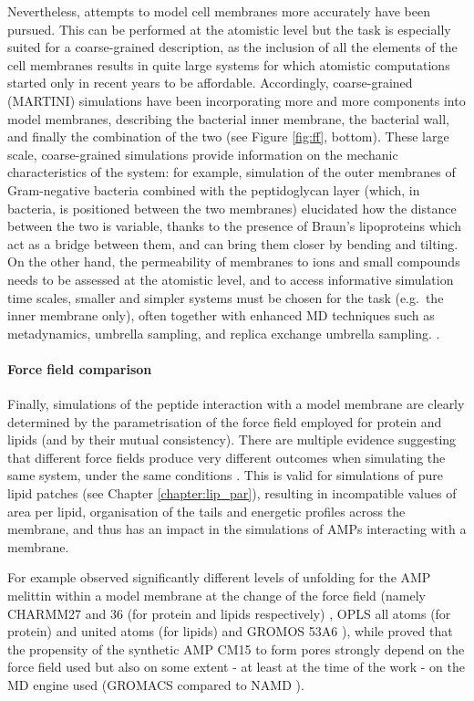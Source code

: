 Nevertheless, attempts to model cell membranes more accurately have been pursued. This can be performed at the atomistic level \citep{Piggot2011}
but the task is especially suited for a coarse-grained description, as the inclusion of all the elements of the cell membranes results in quite large systems for which atomistic computations started only in recent years to be affordable.
%
Accordingly, coarse-grained (MARTINI) simulations have been incorporating more and more components into model membranes, describing the bacterial inner membrane, the bacterial wall, and finally the combination of the two \citep{Khalid2019} (see Figure \ref{fig:ff}, bottom).
%
These large scale, coarse-grained simulations provide information on the mechanic characteristics of the system: for example, simulation of the outer membranes of Gram-negative bacteria combined with the peptidoglycan layer (which, in bacteria, is positioned between the two membranes) elucidated how the distance between the two is variable, thanks to the presence of Braun's lipoproteins \citep{Asmar2018} which act as a bridge between them, and can bring them closer by bending and tilting.
%
On the other hand, the permeability of membranes to ions and small compounds needs to be assessed at the atomistic level, and to access informative simulation time scales, smaller and simpler systems must be chosen for the task (e.g.\ the inner membrane only), often together with enhanced MD techniques such as metadynamics, umbrella sampling, and replica exchange umbrella sampling. \citep{Sun2016,Piggot2011,Carpenter2016,Pokhrel2018}.

\paragraph{Force field comparison} Finally, simulations of the peptide interaction with a model membrane are clearly determined by the parametrisation of the force field employed for protein and lipids (and by their mutual consistency).
%
There are multiple evidence suggesting that different force fields produce very different outcomes when simulating the same system, under the same conditions \citep{Wang2014,Bennett2016,Sandoval-Perez2017}. This is valid for simulations of pure lipid patches (see Chapter \ref{chapter:lip_par}), resulting in incompatible values of area per lipid, organisation of the tails and energetic profiles across the membrane, and thus has an impact in the simulations of AMPs interacting with a membrane.

For example \citet{Wang2014} observed significantly different levels of unfolding for the AMP melittin within a model membrane at the change of the force field (namely CHARMM27 and 36 (for protein and lipids respectively) \citep{MacKerell1998,Klauda2010}, OPLS all atoms (for protein) and united atoms (for lipids) \citep{Jorgensen1996} and GROMOS 53A6 \citep{Oostenbrink2004}), while \citet{Bennett2016} proved that the propensity of the synthetic AMP CM15 to form pores strongly depend on the force field used but also on some extent - at least at the time of the work - on the MD engine used (GROMACS compared to NAMD \citep{Phillips2005}).

